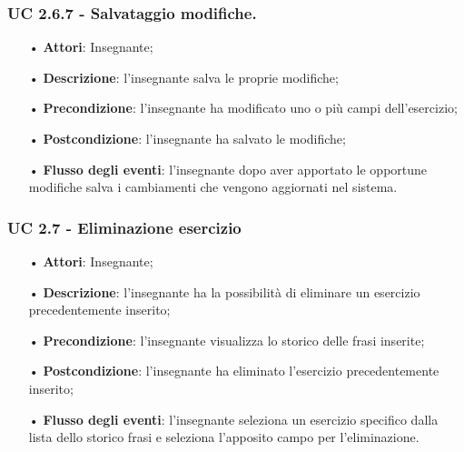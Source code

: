 \subsubsection{UC 2.6.7 - Salvataggio modifiche.} 
\begin{itemize}
	\item[•] \textbf{Attori}: Insegnante;
	\item[•] \textbf{Descrizione}: l'insegnante salva le proprie modifiche;
	\item[•] \textbf{Precondizione}: l'insegnante ha modificato uno o più campi dell'esercizio;
	\item[•] \textbf{Postcondizione}: l'insegnante ha salvato le modifiche;
	\item[•] \textbf{Flusso degli eventi}: l'insegnante dopo aver apportato le opportune modifiche salva i cambiamenti che vengono aggiornati nel sistema.
\end{itemize}


\subsubsection{UC 2.7 - Eliminazione esercizio}
\begin{itemize}
	\item[•] \textbf{Attori}: Insegnante;
	\item[•] \textbf{Descrizione}: l'insegnante ha la possibilità di eliminare un esercizio precedentemente inserito;
	\item[•] \textbf{Precondizione}: l'insegnante visualizza lo storico delle frasi inserite;
	\item[•] \textbf{Postcondizione}: l'insegnante ha eliminato l'esercizio precedentemente inserito;
	\item[•] \textbf{Flusso degli eventi}: l'insegnante seleziona un esercizio specifico dalla lista dello storico frasi e seleziona l'apposito campo per l'eliminazione.
\end{itemize}


